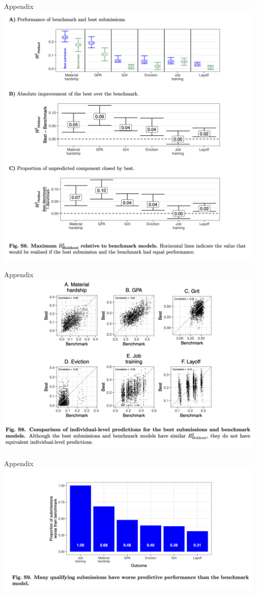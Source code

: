 \documentclass{beamer}
\begin{document}
\begin{frame}{Appendix}
\centering
\includegraphics[height = .8\textheight]{figures/si_best_vs_benchmark}
\end{frame}

\begin{frame}{Appendix}
\includegraphics[width = \textwidth]{figures/si_best_benchmark_scatter}
\end{frame}

\begin{frame}{Appendix}
\includegraphics[width = \textwidth]{figures/si_worse_than_benchmark}
\end{frame}
\end{document}
